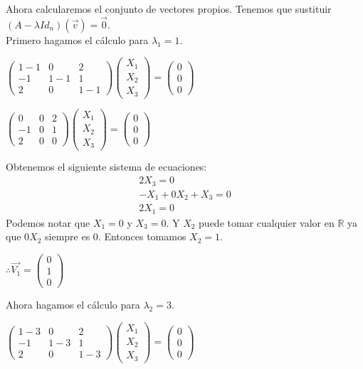 \documentclass[letterpaper]{article}
\renewcommand{\*}{\cdot}
\theoremstyle{definition}
\begin{document}
	Ahora calcularemos el conjunto de vectores propios. Tenemos que sustituir $(A-\lambda Id_{n})(\vec{v})= \vec{0}$.\\
	Primero hagamos el cálculo para $\lambda_{1} = 1$.
	\begin{center}
		$\begin{pmatrix} 1-1 & 0 & 2 \\ -1 & 1-1 & 1 \\ 2 & 0 & 1-1  \end{pmatrix} \begin{pmatrix} X_{1} \\ X_{2} \\ X_{3} \end{pmatrix} = \begin{pmatrix} 0 \\ 0 \\ 0 \end{pmatrix}$
	\end{center}
	\begin{center}
		$\begin{pmatrix} 0 & 0 & 2 \\ -1 & 0 & 1 \\ 2 & 0 & 0  \end{pmatrix} \begin{pmatrix} X_{1} \\ X_{2} \\ X_{3} \end{pmatrix} = \begin{pmatrix} 0 \\ 0 \\ 0 \end{pmatrix}$
	\end{center}
	Obtenemos el siguiente sistema de ecuaciones:
	\begin{align*}
	2X_{3} = 0\\
	-X_{1}+ 0X_{2}+ X_{3} = 0\\
	2X_{1} = 0
	\end{align*}
	Podemos notar que $X_{1} = 0$ y $X_{3} = 0$. Y $X_{2}$ puede tomar cualquier valor en $\mathbb{R}$ ya que $0X_{2}$ siempre es 0. Entonces tomamos $X_{2} = 1$.
	\begin{center}
		$\therefore \vec{V_{1}} = \begin{pmatrix} 0 \\ 1 \\ 0 \end{pmatrix}$
	\end{center}
	Ahora hagamos el cálculo para $\lambda_{2} = 3$.
	\begin{center}
		$\begin{pmatrix} 1-3 & 0 & 2 \\ -1 & 1-3 & 1 \\ 2 & 0 & 1-3  \end{pmatrix} \begin{pmatrix} X_{1} \\ X_{2} \\ X_{3} \end{pmatrix} = \begin{pmatrix} 0 \\ 0 \\ 0 \end{pmatrix}$
	\end{center}
\end{document}
